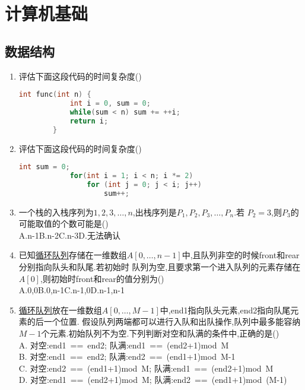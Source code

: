 \documentclass[12pt, a4paper, oneside, UTF8]{ctexbook}
\begin{document}
% 
\else
\fi
\chapter{计算机基础}
\section{数据结构}
\begin{enumerate}
    \item  评估下面这段代码的时间复杂度()
    \begin{lstlisting}[language=C]
        int func(int n) {
            int i = 0, sum = 0;
            while(sum < n) sum += ++i;
            return i;
        }
    \end{lstlisting}
    \begin{solution}
        
    \end{solution}

    \item 评估下面这段代码的时间复杂度()
    \begin{lstlisting}[language=C]
        int sum = 0;
            for(int i = 1; i < n; i *= 2)
                for (int j = 0; j < i; j++)
                    sum++;
    \end{lstlisting}

    \begin{solution}
        
    \end{solution}

    \item 一个栈的入栈序列为\underline{$1,2,3,\ldots,n$},出栈序列是\underline{$P_1,P_2,P_3,\ldots,P_n$}.若
    $P_2=3$,则$P_3$的可能取值的个数可能是() \\
    A.n-1\qquad B.n-2\qquad C.n-3\qquad D.无法确认 

    \item 已知\underline{循环队列}存储在一维数组$A[0,\ldots,n-1]$中,且队列非空的时候front和rear分别指向队头和队尾.若初始时
    队列为空,且要求第一个进入队列的元素存储在$A[0]$,则初始时front和rear的值分别为() \\
    A.0,0\qquad\qquad B.0,n-1\qquad\qquad C.n-1,0\qquad\qquad D.n-1,n-1

    \item \underline{循环队列}放在一维数组$A[0,\ldots,M-1]$中,end1指向队头元素,end2指向队尾元素的后一个位置.
    假设队列两端都可以进行入队和出队操作,队列中最多能容纳$M-1$个元素.初始队列不为空.下列判断对空和队满的条件中,正确的是() \\
    A. 对空:end1\ ==\ end2; \qquad\qquad\qquad\qquad\quad 队满:end1\ ==\ (end2+1)mod\ M\\
    B. 对空:end1\ ==\ end2; \qquad\qquad\qquad\qquad\quad 队满:end2\ ==\ (end1+1)mod\ M-1\\
    C. 对空:end2\ ==\ (end1+1)mod\ M; \qquad\qquad 队满:end1\ ==\ (end2+1)mod\ M\\
    D. 对空:end1\ ==\ (end2+1)mod\ M; \qquad\qquad 队满:end2\ ==\ (end1+1)mod\ (M-1)
    

\end{enumerate}
\end{document}
